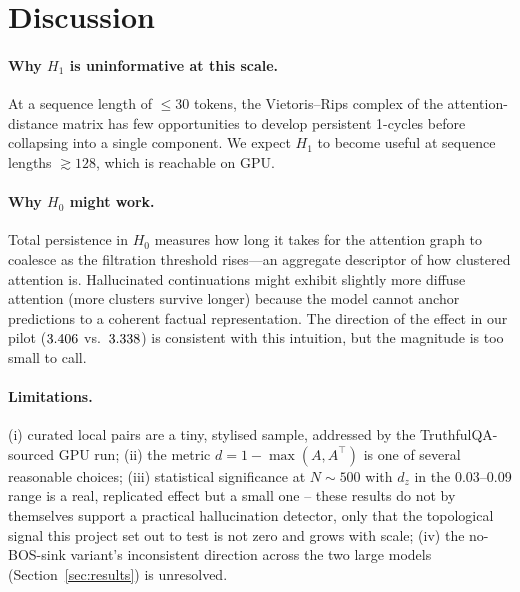 \section{Discussion}
\paragraph{Why $H_1$ is uninformative at this scale.}
At a sequence length of $\le 30$ tokens, the Vietoris--Rips complex of
the attention-distance matrix has few opportunities to develop
persistent 1-cycles before collapsing into a single component. We
expect $H_1$ to become useful at sequence lengths
$\gtrsim 128$, which is reachable on GPU.

\paragraph{Why $H_0$ might work.}
Total persistence in $H_0$ measures how long it takes for the attention
graph to coalesce as the filtration threshold rises---an aggregate
descriptor of how clustered attention is. Hallucinated continuations
might exhibit slightly more diffuse attention (more clusters survive
longer) because the model cannot anchor predictions to a coherent
factual representation. The direction of the effect in our pilot
($3.406$ vs.\ $3.338$) is consistent
with this intuition, but the magnitude is too small to call.

\paragraph{Limitations.}
(i) curated local pairs are a tiny, stylised sample, addressed by the
TruthfulQA-sourced GPU run; (ii) the metric $d=1-\max(A,A^\top)$ is one of
several reasonable choices; (iii) statistical significance at
$N\sim500$ with $d_z$ in the 0.03--0.09 range is a real, replicated
effect but a small one -- these results do not by themselves support a
practical hallucination detector, only that the topological signal this
project set out to test is not zero and grows with scale; (iv) the
no-BOS-sink variant's inconsistent direction across the two large models
(Section~\ref{sec:results}) is unresolved.
